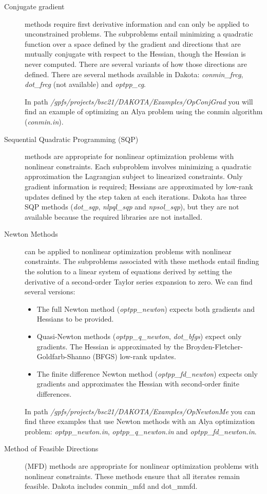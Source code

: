 \documentclass[12pt,a4paper,article]{memoir}
\begin{document}
\begin{description}

\item[Conjugate gradient] methods require first derivative information and can only be applied to unconstrained problems. The subproblems entail minimizing a quadratic function over a space defined by the gradient and directions
that are mutually conjugate with respect to the Hessian, though the Hessian is never computed. There are several variants of how those directions are defined. There are several methods available in Dakota: \textit{conmin\_frcg}, \textit{dot\_frcg} (not available) and \textit{optpp\_cg}.

In path \textit{/gpfs/projects/bsc21/DAKOTA/Examples/OpConjGrad} you will find an example of optimizing an Alya problem using the conmin algorithm (\textit{conmin.in}).

\item[Sequential Quadratic Programming (SQP)] methods are appropriate for nonlinear optimization problems with nonlinear constraints. Each subproblem involves minimizing a quadratic approximation the Lagrangian subject to linearized constraints. Only gradient information is required; Hessians are approximated by low-rank updates defined by the step taken at each iterations. Dakota has three SQP methods (\textit{dot\_sqp}, \textit{nlpql\_sqp} and \textit{npsol\_sqp}), but they are not available because the required libraries are not installed.

\item[Newton Methods] can be applied to nonlinear optimization problems with nonlinear constraints. The subproblems associated with these methods entail finding the solution to a linear system of equations derived by setting the derivative of a second-order Taylor series expansion to zero. We can find several versions:

\begin{itemize}
\item The full Newton method (\textit{optpp\_newton}) expects both gradients and Hessians to be provided.
\item Quasi-Newton methods (\textit{optpp\_q\_newton}, \textit{dot\_bfgs}) expect only gradients. The Hessian is approximated by the Broyden-Fletcher-Goldfarb-Shanno (BFGS) low-rank updates.
\item The finite difference Newton method (\textit{optpp\_fd\_newton}) expects only gradients and approximates the Hessian with second-order finite differences.
\end{itemize}

In path \textit{/gpfs/projects/bsc21/DAKOTA/Examples/OpNewtonMe} you can find three examples that use Newton methods with an Alya optimization problem: \textit{optpp\_newton.in},  \textit{optpp\_q\_newton.in} and \textit{optpp\_fd\_newton.in}.

\item[Method of Feasible Directions] (MFD) methods are appropriate for nonlinear optimization problems with nonlinear
constraints. These methods ensure that all iterates remain feasible. Dakota includes conmin\_mfd and dot\_mmfd.

\end{description}
\end{document}
